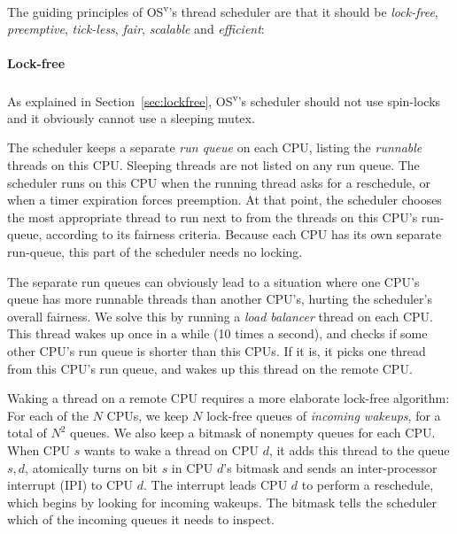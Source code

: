 \documentclass{sig-alternate}
\begin{document}
\label{sec:sched}
The guiding principles of OS\textsuperscript{v}'s thread scheduler are that it should be
\emph{lock-free}, \emph{preemptive}, \emph{tick-less}, \emph{fair},
\emph{scalable} and \emph{efficient}:

\paragraph{Lock-free}
As explained in Section~\ref{sec:lockfree}, OS\textsuperscript{v}'s scheduler should not use spin-locks
and it obviously cannot use a sleeping mutex.

The scheduler keeps a separate \emph{run queue} on each CPU, listing the
\emph{runnable} threads on this CPU. Sleeping
threads are not listed on any run queue. The scheduler runs on this
CPU when the running thread asks for a reschedule, or when a timer expiration 
forces preemption. At that point, the scheduler chooses the most appropriate
thread to run next to from the threads
on this CPU's run-queue, according to its fairness criteria.
Because each CPU has its own separate run-queue, this part of the scheduler
needs no locking.

The separate run queues can obviously lead to a situation where one CPU's
queue has more runnable threads than another CPU's, hurting the scheduler's
overall fairness. We solve this by running a \emph{load balancer} thread on each
CPU. This thread wakes up once in a while (10 times a second), and checks
if some other CPU's run queue is shorter than this CPUs. If it is, it picks
one thread from this CPU's run queue, and wakes up this thread on the
remote CPU.

Waking a thread on a remote CPU requires a more elaborate lock-free algorithm:
For each of the $N$ CPUs, we keep $N$ lock-free queues of \emph{incoming
wakeups}, for a total of $N^2$ queues. We also keep a
bitmask of nonempty queues for each CPU. When CPU $s$ wants to wake a thread
on CPU $d$, it adds this thread to the queue $s,d$, atomically turns on bit $s$ in CPU $d$'s bitmask
and sends an inter-processor interrupt (IPI) to CPU $d$.
The interrupt leads CPU $d$ to perform a reschedule, which begins by looking
for incoming wakeups. The bitmask tells the scheduler which of the incoming queues
it needs to inspect.
\end{document}

